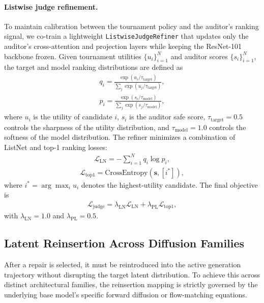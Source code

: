 \documentclass[11pt]{article}
\begin{document}
\paragraph{Listwise judge refinement.}
To maintain calibration between the tournament policy and the auditor’s
ranking signal, we co-train a lightweight
\texttt{ListwiseJudgeRefiner} that updates only the auditor’s
cross-attention and projection layers while keeping the ResNet-101
backbone frozen. Given tournament utilities $\{u_i\}_{i=1}^{N}$ and
auditor scores $\{s_i\}_{i=1}^{N}$, the target and model ranking
distributions are defined as
\begin{align*}
q_i = \frac{\exp(u_i/\tau_{\mathrm{target}})}{\sum_j \exp(u_j/\tau_{\mathrm{target}})},
\end{align*}
\begin{align*}
p_i = \frac{\exp(s_i/\tau_{\mathrm{model}})}{\sum_j \exp(s_j/\tau_{\mathrm{model}})},
\end{align*}
where $u_i$ is the utility of candidate $i$, $s_i$ is the auditor
safe score, $\tau_{\mathrm{target}}=0.5$ controls the
sharpness of the utility distribution, and
$\tau_{\mathrm{model}}=1.0$ controls the softness of the model
distribution. The refiner minimizes a combination of ListNet and top-1
ranking losses:
\begin{align*}
\mathcal{L}_{\mathrm{LN}} = -\sum_{i=1}^{N} q_i \log p_i,
\end{align*}
\begin{align*}
\mathcal{L}_{\mathrm{top1}} = \mathrm{CrossEntropy}(\mathbf{s}, [i^*]),
\end{align*}
where $i^*=\arg\max_i u_i$ denotes the highest-utility candidate. The
final objective is
\begin{align*}
\mathcal{L}_{\mathrm{judge}} =
\lambda_{\mathrm{LN}}\mathcal{L}_{\mathrm{LN}}
+
\lambda_{\mathrm{PL}}\mathcal{L}_{\mathrm{top1}},
\end{align*}
with $\lambda_{\mathrm{LN}}=1.0$ and
$\lambda_{\mathrm{PL}}=0.5$.
\fi
\subsection{Latent Reinsertion Across Diffusion Families}
\label{sec:reinsertion}

After a repair is selected, it must be reintroduced into the active generation trajectory without disrupting the target latent distribution. To achieve this across distinct architectural families, the reinsertion mapping is strictly governed by the underlying base model's specific forward diffusion or flow-matching equations.
\end{document}
